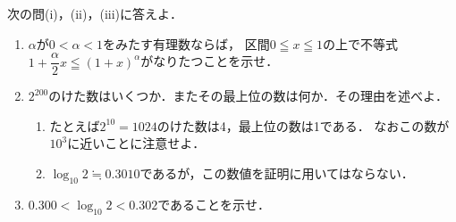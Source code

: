 \documentclass[../../main.tex]{subfiles}
\begin{document}
次の問(i)，(ii)，(iii)に答えよ．
\begin{enumerate}
  \item[(i)] $\alpha$が$0<\alpha<1$をみたす有理数ならば，
    区間$0 \leqq x \leqq 1$の上で不等式$\displaystyle 1+\dfrac{\alpha}{2}x \leqq (1+x)^\alpha$がなりたつことを示せ．
  \item[(ii)] $2^{200}$のけた数はいくつか．またその最上位の数は何か．その理由を述べよ．
    \begin{enumerate}
      \item[注1.] たとえば$2^{10}=1024$のけた数は4，最上位の数は1である．
        なおこの数が$10^3$に近いことに注意せよ．
      \item[注2.] $\log_{10}2 \fallingdotseq 0.3010$であるが，この数値を証明に用いてはならない．
    \end{enumerate}
  \item[(iii)] $0.300<\log_{10}2<0.302$であることを示せ．
\end{enumerate}
\end{document}
